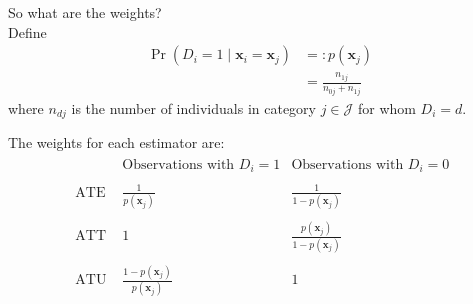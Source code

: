 \noindent So what are the weights? \\

\noindent Define 
\begin{align}
	\Pr \left( D_i = 1 \mid \bm{x}_i = \bm{x}_j \right) & =: p \left( \bm{x}_j \right) \nonumber \\ 
	& = \frac{n_{1j}}{n_{0j} + n_{1j}}  
\end{align}
\noindent where $n_{dj}$ is the number of individuals in category $j \in \mathcal{J}$ for whom $D_i = d$. 

\noindent The weights for each estimator are:
\begin{align}
	\begin{array}{lcc}
		& \text{Observations with $D_i = 1$} & \text{Observations with $D_i = 0$} \\
		& & \\
	\text{     ATE     } & \frac{ 1 } { p \left( \bm{x}_j \right) } & \frac{ 1 } { 1 - p \left( \bm{x}_j \right) } \\
	    & & \\
	\text{     ATT     } & 1 & \frac{ p \left( \bm{x}_j \right) } { 1 - p \left( \bm{x}_j \right) } \\
		& & \\
	\text{     ATU     } & \frac{ 1 - p \left( \bm{x}_j \right) } { p \left( \bm{x}_j \right) } & 1 \\
	\end{array}
\end{align}



